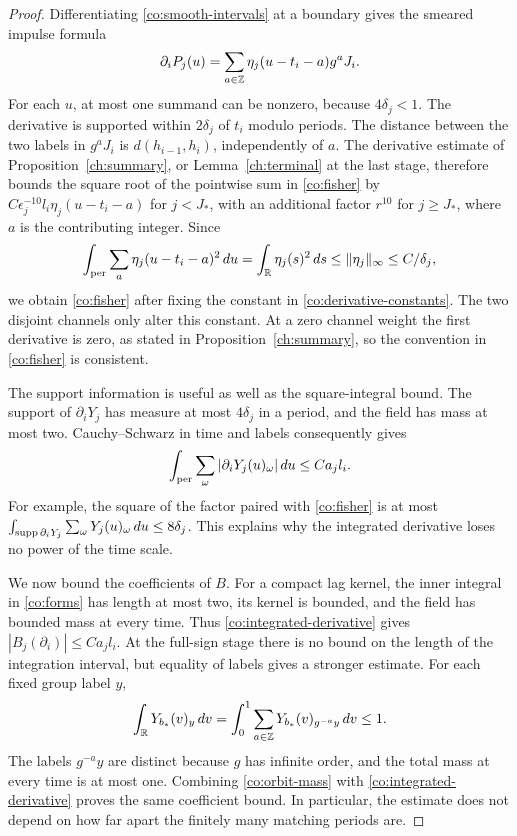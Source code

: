 \begin{proof}
Differentiating \eqref{co:smooth-intervals} at a boundary gives the smeared
impulse formula
\begin{equation}
 \partial_iP_j(u)
 =\sum_{a\in\mathbb Z}\eta_j(u-t_i-a)g^aJ_i.
 \label{co:smeared-impulse}
\end{equation}
For each $u$, at most one summand can be nonzero, because
$4\delta_j<1$.  The derivative is supported within $2\delta_j$ of
$t_i$ modulo periods.  The distance between the two labels in $g^aJ_i$
is $d(h_{i-1},h_i)$, independently of $a$.  The derivative estimate of
Proposition~\ref{ch:summary}, or Lemma~\ref{ch:terminal} at the last
stage, therefore bounds the square root of the pointwise sum in
\eqref{co:fisher} by
$C\epsilon_j^{-10}l_i\eta_j(u-t_i-a)$ for $j<J_*$, with an additional
factor $r^{10}$ for $j\geq J_*$, where $a$ is the contributing integer.
Since
\[
 \int_{\rm per}\sum_a\eta_j(u-t_i-a)^2\,du
 =\int_{\mathbb R}\eta_j(s)^2\,ds
 \leq\|\eta_j\|_\infty\leq C/\delta_j,
\]
we obtain \eqref{co:fisher} after fixing the constant in
\eqref{co:derivative-constants}.  The two disjoint channels only alter
this constant.  At a zero channel weight the first derivative is zero,
as stated in Proposition~\ref{ch:summary}, so the convention in
\eqref{co:fisher} is consistent.

The support information is useful as well as the square-integral bound.
The support of $\partial_iY_j$ has measure at most $4\delta_j$ in a
period, and the field has mass at most two.  Cauchy--Schwarz in time and
labels consequently gives
\begin{equation}
 \int_{\rm per}\sum_\omega|\partial_iY_j(u)_\omega|\,du
 \leq C a_jl_i.
 \label{co:integrated-derivative}
\end{equation}
For example, the square of the factor paired with
\eqref{co:fisher} is at most
$\int_{\operatorname{supp}\partial_iY_j}\sum_\omega Y_j(u)_\omega\,du
\leq8\delta_j$.  This explains why the integrated derivative loses no
power of the time scale.

We now bound the coefficients of $B$.  For a compact lag kernel, the
inner integral in \eqref{co:forms} has length at most two, its kernel is
bounded, and the field has bounded mass at every time.  Thus
\eqref{co:integrated-derivative} gives
$|B_j(\partial_i)|\leq Ca_jl_i$.  At the full-sign stage there is no
bound on the length of the integration interval, but equality of labels
gives a stronger estimate.  For each fixed group label $y$,
\begin{equation}
 \int_{\mathbb R}Y_{b_*}(v)_y\,dv
 =\int_0^1\sum_{a\in\mathbb Z}Y_{b_*}(v)_{g^{-a}y}\,dv
 \leq1.
 \label{co:orbit-mass}
\end{equation}
The labels $g^{-a}y$ are distinct because $g$ has infinite order, and the
total mass at every time is at most one.  Combining
\eqref{co:orbit-mass} with \eqref{co:integrated-derivative} proves the
same coefficient bound.  In particular, the estimate does not depend
on how far apart the finitely many matching periods are.


\end{proof}
